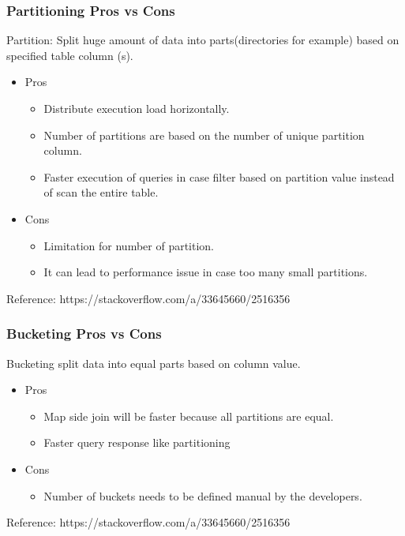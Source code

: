 \begin{frame}
	\frametitle{Partitioning Pros vs Cons}
	
Partition: Split huge amount of data into parts(directories for example) based on specified table column (s).

	\begin{itemize}[<+->]
		\item Pros
		\begin{itemize}[<+->]
			\item Distribute execution load horizontally.
			\item Number of partitions are based on the number of unique partition column.
			\item Faster execution of queries in case filter based on partition value instead of scan the entire table.
		\end{itemize}
	
		\item Cons
			\begin{itemize}[<+->]
			\item Limitation for number of partition.
			\item It can lead to performance issue in case too many small partitions.
		\end{itemize}
			
	\end{itemize}
\vspace{1.3cm}
Reference: https://stackoverflow.com/a/33645660/2516356	
\end{frame}


\begin{frame}
	\frametitle{Bucketing Pros vs Cons}
	
Bucketing split data into equal parts based on column value. 
	\begin{itemize}[<+->]
		\item Pros
		\begin{itemize}[<+->]
			\item Map side join will be faster because all partitions are equal.
			\item Faster query response like partitioning
		\end{itemize}
		
		\item Cons
		\begin{itemize}[<+->]
			\item Number of buckets needs to be defined manual by the developers.
		\end{itemize}
		
	\end{itemize}
\vspace{3.6cm}
	Reference: https://stackoverflow.com/a/33645660/2516356
\end{frame}

